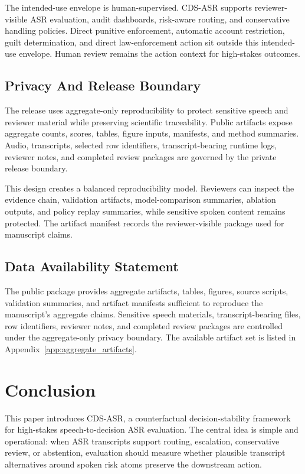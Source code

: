 The intended-use envelope is human-supervised. CDS-ASR supports reviewer-visible ASR evaluation, audit dashboards, risk-aware routing, and conservative handling policies. Direct punitive enforcement, automatic account restriction, guilt determination, and direct law-enforcement action sit outside this intended-use envelope. Human review remains the action context for high-stakes outcomes.

\subsection{Privacy And Release Boundary}

The release uses aggregate-only reproducibility to protect sensitive speech and reviewer material while preserving scientific traceability. Public artifacts expose aggregate counts, scores, tables, figure inputs, manifests, and method summaries. Audio, transcripts, selected row identifiers, transcript-bearing runtime logs, reviewer notes, and completed review packages are governed by the private release boundary.

This design creates a balanced reproducibility model. Reviewers can inspect the evidence chain, validation artifacts, model-comparison summaries, ablation outputs, and policy replay summaries, while sensitive spoken content remains protected. The artifact manifest records the reviewer-visible package used for manuscript claims.

\subsection{Data Availability Statement}

The public package provides aggregate artifacts, tables, figures, source scripts, validation summaries, and artifact manifests sufficient to reproduce the manuscript's aggregate claims. Sensitive speech materials, transcript-bearing files, row identifiers, reviewer notes, and completed review packages are controlled under the aggregate-only privacy boundary. The available artifact set is listed in Appendix~\ref{app:aggregate_artifacts}.

\section{Conclusion}

This paper introduces CDS-ASR, a counterfactual decision-stability framework for high-stakes speech-to-decision ASR evaluation. The central idea is simple and operational: when ASR transcripts support routing, escalation, conservative review, or abstention, evaluation should measure whether plausible transcript alternatives around spoken risk atoms preserve the downstream action.

